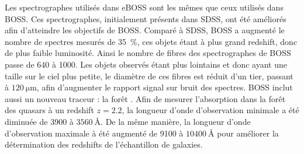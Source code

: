 \documentclass[11pt, twoside, a4paper, openright]{report}
\begin{document}
Les spectrographes utilisés dans eBOSS sont les mêmes que ceux utilisés dans BOSS. Ces spectrographes, initialement présents dans SDSS, ont été améliorés afin d'atteindre les objectifs de BOSS. Comparé à SDSS, BOSS a augmenté le nombre de spectres mesurés de \SI{35}{\percent}, ces objets étant à plus grand redshift, donc de plus faible luminosité. Ainsi le nombre de fibres des spectrographes de BOSS passe de \num{640} à \num{1000}. Les objets observés étant plus lointains et donc ayant une taille sur le ciel plus petite, le diamètre de ces fibres est réduit d'un tier, passant à $\SI{120}{\micro\meter}$, afin d'augmenter le rapport signal sur bruit des spectres. BOSS inclut aussi un nouveau traceur : la forêt \lya{}. Afin de mesurer l'absorption dans la forêt \lya{} des quasars à un redshift $z=\num{2,2}$, la longueur d'onde d'observation minimale a été diminuée de \num{3900} à $\SI{3560}{\angstrom}$. De la même manière, la longueur d'onde d'observation maximale à été augmenté de \num{9100} à $\SI{10400}{\angstrom}$ pour améliorer la détermination des redshifts de l'échantillon de galaxies.
\end{document}

